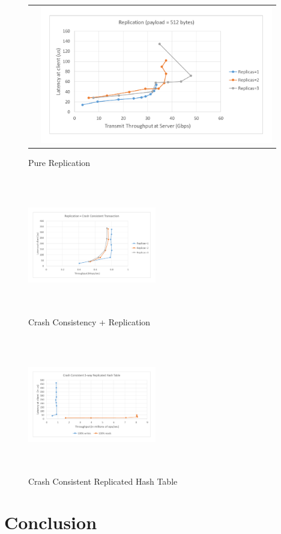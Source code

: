 \documentclass[letterpaper,twocolumn,10pt]{article}
\begin{document}
\begin{figure}
\begin{tabular}{cc}
\begin{minipage}{0.5\textwidth}
\end{minipage}&
\begin{minipage}{0.5\textwidth}
  \includegraphics[width=\textwidth,height=6cm]{results/replication_gbps_512.pdf}
\end{minipage}
\end{tabular}
\caption{Pure Replication}
\label{fig:pure_rep}
\end{figure}

\begin{figure}
  \includegraphics[width=0.5\textwidth,height=6cm]{results/cc_mops.pdf}
  \caption{Crash Consistency + Replication}
  \label{fig:cc_rep}
\end{figure}

\begin{figure}
  \includegraphics[width=0.5\textwidth,height=6cm]{results/app_mops.pdf}
  \caption{Crash Consistent Replicated Hash Table}
  \label{fig:app_rep}
\end{figure}

\section{Conclusion}
\end{document}
